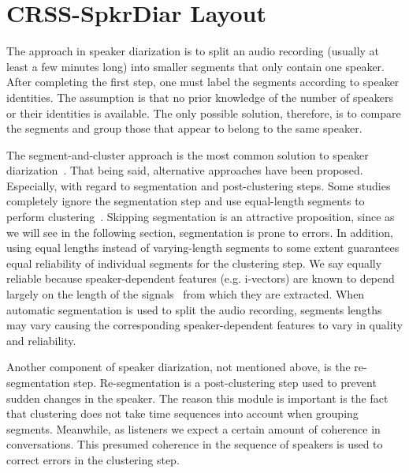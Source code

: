  
\section{CRSS-SpkrDiar Layout}
\label{sec:crssdiar_layout}

The approach in speaker diarization is to split an audio recording (usually at least a few minutes long) into smaller segments that only contain one speaker.
After completing the first step, one must label the segments according to speaker identities. 
The assumption is that no prior knowledge of the number of speakers or their identities is available. 
The only possible solution, therefore, is to compare the segments and group those that appear to belong to the same speaker. 

The segment-and-cluster approach is the most common solution to speaker diarization~\cite{meignier2010lium,anguera2012diarization}. 
That being said, alternative approaches have been proposed. 
Especially, with regard to segmentation and post-clustering steps. 
Some studies completely ignore the segmentation step and use equal-length segments to perform clustering~\cite{sell_garcia_2015diarization}. 
Skipping segmentation is an attractive proposition, since as we will see in the following section, segmentation is prone to errors. 
In addition, using equal lengths instead of varying-length segments to some extent guarantees equal reliability of individual segments for the clustering step. 
We say equally reliable because speaker-dependent features (e.g. i-vectors) are known to depend largely on the length of the signals~\cite{hasan2013duration} from which they are extracted. 
When automatic segmentation is used to split the audio recording, segments lengths may vary causing the corresponding speaker-dependent features to vary in quality and reliability. 

Another component of speaker diarization, not mentioned above, is the re-segmentation step. 
Re-segmentation is a post-clustering step used to prevent sudden changes in the speaker. 
The reason this module is important is the fact that clustering does not take time sequences into account when grouping segments. 
Meanwhile, as listeners we expect a certain amount of coherence in conversations. 
This presumed coherence in the sequence of speakers is used to correct errors in the clustering step. 

